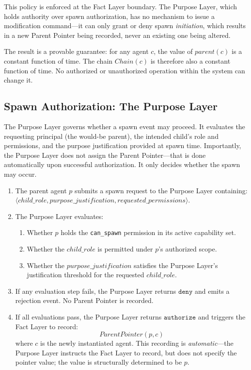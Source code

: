 This policy is enforced at the Fact Layer boundary. The Purpose Layer, which holds authority over spawn authorization, has no mechanism to issue a modification command—it can only grant or deny spawn \textit{initiation}, which results in a new Parent Pointer being recorded, never an existing one being altered.

The result is a provable guarantee: for any agent $c$, the value of $parent(c)$ is a constant function of time. The chain $Chain(c)$ is therefore also a constant function of time. No authorized or unauthorized operation within the system can change it.

\subsection{Spawn Authorization: The Purpose Layer}

The Purpose Layer governs whether a spawn event may proceed. It evaluates the requesting principal (the would-be parent), the intended child's role and permissions, and the purpose justification provided at spawn time. Importantly, the Purpose Layer does not assign the Parent Pointer—that is done automatically upon successful authorization. It only decides whether the spawn may occur.

\begin{algorithm}
\label{alg:spawn-auth}
\begin{enumerate}
    \item The parent agent $p$ submits a spawn request to the Purpose Layer containing: $\langle child\_role, purpose\_justification, requested\_permissions \rangle$.
    \item The Purpose Layer evaluates:
    \begin{enumerate}
        \item Whether $p$ holds the \texttt{can\_spawn} permission in its active capability set.
        \item Whether the $child\_role$ is permitted under $p$'s authorized scope.
        \item Whether the $purpose\_justification$ satisfies the Purpose Layer's justification threshold for the requested $child\_role$.
    \end{enumerate}
    \item If any evaluation step fails, the Purpose Layer returns $\texttt{deny}$ and emits a rejection event. No Parent Pointer is recorded.
    \item If all evaluations pass, the Purpose Layer returns $\texttt{authorize}$ and triggers the Fact Layer to record:
    \[
    ParentPointer(p, c)
    \]
    where $c$ is the newly instantiated agent. This recording is \textit{automatic}—the Purpose Layer instructs the Fact Layer to record, but does not specify the pointer value; the value is structurally determined to be $p$.
\end{enumerate}
\end{algorithm}

